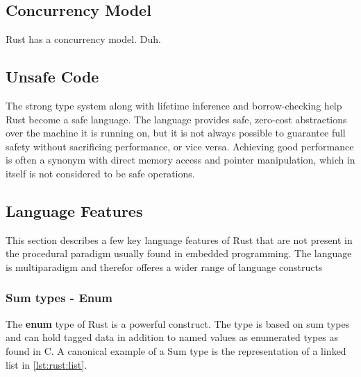 

\subsection{Concurrency Model} %
\label{ssub:concurrency_model}

Rust has a concurrency model. Duh.


\subsection{Unsafe Code} %
\label{ssub:unsafe_code}

The strong type system along with lifetime inference and borrow-checking help Rust become a safe language.
The language provides safe, zero-cost abstractions over the machine it is running on, but it is not always possible to guarantee full safety without sacrificing performance, or vice versa.
Achieving good performance is often a synonym with direct memory access and pointer manipulation, which in itself is not considered to be safe operations.


\subsection{Language Features}

This section describes a few key language features of Rust that are not present in the procedural paradigm usually found in embedded programming.
The language is multiparadigm and therefor offeres a wider range of language constructs

\subsubsection{Sum types - Enum}

The \textbf{enum} type of Rust is a powerful construct.
The type is based on sum types and can hold tagged data in addition to named values as enumerated types as found in C.
A canonical example of a Sum type is the representation of a linked list in \autoref{lst:rust:list}.

